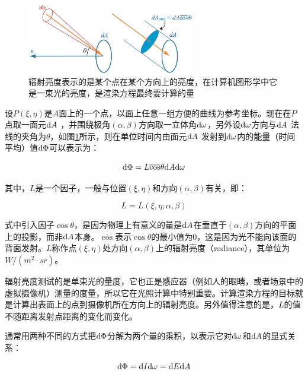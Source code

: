 \begin{figure}
\sidecaption
	\includegraphics[width=0.65\textwidth]{figures/intro/radiance}
	\caption{辐射亮度表示的是某个点在某个方向上的亮度，在计算机图形学中它是一束光的亮度，是渲染方程最终要计算的量}
	\label{f:intro-radiance}
\end{figure}

设$P(\xi,\eta)$是$A$面上的一个点，以面上任意一组方便的曲线为参考坐标。现在在$P$点取一面元${\rm d}A$ ，并围绕极角$(\alpha,\beta)$方向取一立体角${\rm d}\omega$，另外设${\rm d}\omega$方向与${\rm d}A$ 法线的夹角为$\theta$，如图\ref{f:intro-radiance}所示，则在单位时间内由面元${\rm d}A$ 发射到${\rm d}\omega$内的能量（时间平均）值${\rm d}\Phi$可以表示为：

\begin{equation}\label{eq:intro-energy}
	{\rm d}\Phi=L\overline{\cos}\theta {\rm d}A {\rm d}\omega
\end{equation}

\noindent 其中，$L$是一个因子，一般与位置$(\xi,\eta)$和方向$(\alpha,\beta)$有关，即：

\begin{equation}
	L=L(\xi,\eta;\alpha,\beta)
\end{equation}

\noindent 式中引入因子$\cos\theta$，是因为物理上有意义的量是${\rm d}A$在垂直于$(\alpha,\beta)$方向的平面上的投影，而非${\rm d}A$本身。$\overline{\cos}$表示$\cos\theta$的最小值为$0$，这是因为光不能向该面的背面发射。$L$称作点$(\xi,\eta)$处方向$(\alpha,\beta)$上的辐射亮度（radiance），其单位为$W/(m^2\cdot sr)$。

辐射亮度测试的是单束光的量度，它也正是感应器（例如人的眼睛，或者场景中的虚拟摄像机）测量的度量，所以它在光照计算中特别重要。计算渲染方程的目标就是计算出表面上的点到摄像机所在方向上的辐射亮度。另外值得注意的是，$L$的值不随距离发射点距离的变化而变化。

通常用两种不同的方式把${\rm d}\Phi$分解为两个量的乘积，以表示它对${\rm d}\omega$和${\rm d} A$的显式关系：

\begin{equation}\label{eq:intro-energy-1}
	{\rm d}\Phi={\rm d}I {\rm d}\omega={\rm d}E {\rm d}A
\end{equation}

